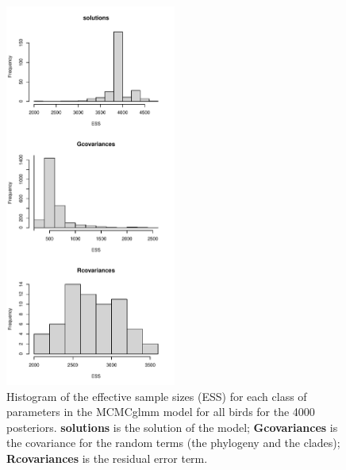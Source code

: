 \documentclass[12pt,a4paper]{article}
\begin{document}
\newpage

\begin{figure}[H]
\centering
   \includegraphics[width=0.5\textwidth]{Figures/parameters_ESS_all_birds.pdf}
\caption{Histogram of the effective sample sizes (ESS) for each class of parameters in the MCMCglmm model for all birds for the 4000 posteriors. \textbf{solutions} is the solution of the model; \textbf{Gcovariances} is the covariance for the random terms (the phylogeny and the clades); \textbf{Rcovariances} is the residual error term.}
\label{Fig:model_ess_all_birds}
\end{figure}

\newpage
\end{document}
